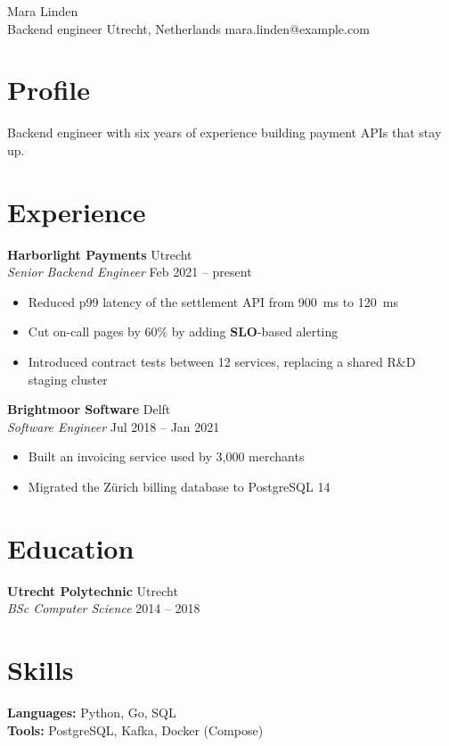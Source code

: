 \documentclass[11pt]{article}
\newcommand{\job}[4]{\textbf{#1} \hfill #2\\ \textit{#3} \hfill #4\par}
\newcommand{\bul}[1]{\item #1}
\newcommand{\skillline}[2]{\textbf{#1:} #2\\}
\begin{document}
\begin{center}
  {\Huge Mara Linden}\\
  Backend engineer \textbullet{} Utrecht, Netherlands \textbullet{} mara.linden@example.com
\end{center}

\section*{Profile}
Backend engineer with six years of experience building payment APIs that stay up.

\section*{Experience}
\job{Harborlight Payments}{Utrecht}{Senior Backend Engineer}{Feb 2021 -- present}
\begin{itemize}
  \bul{Reduced p99 latency of the settlement API from 900~ms to 120~ms}
  \bul{Cut on-call pages by 60\% by adding \textbf{SLO}-based alerting}
  \bul{Introduced contract tests between 12 services, replacing a shared R\&D staging cluster}
\end{itemize}

\job{Brightmoor Software}{Delft}{Software Engineer}{Jul 2018 -- Jan 2021}
\begin{itemize}
  \bul{Built an invoicing service used by 3,000 merchants}
  \bul{Migrated the Z\"urich billing database to PostgreSQL 14}
\end{itemize}

\section*{Education}
\job{Utrecht Polytechnic}{Utrecht}{BSc Computer Science}{2014 -- 2018}

\section*{Skills}
\skillline{Languages}{Python, Go, SQL}
\skillline{Tools}{PostgreSQL, Kafka, Docker (Compose)}
\end{document}
